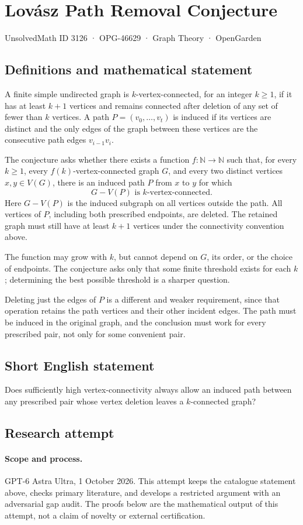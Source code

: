 \documentclass[11pt,a4paper]{article}
\begin{document}
\section*{Lovász Path Removal Conjecture}\label{3126}
{\small UnsolvedMath ID 3126 · OPG-46629 · Graph Theory · OpenGarden}
\subsection{Definitions and mathematical statement}
A finite simple undirected graph is $k$-vertex-connected, for an integer
$k\ge1$, if it has at least $k+1$ vertices and remains connected after
deletion of any set of fewer than $k$ vertices. A path
$P=(v_0,\ldots,v_t)$ is induced if its vertices are distinct and the
only edges of the graph between these vertices are the consecutive
path edges $v_{i-1}v_i$.

The conjecture asks whether there exists a function
$f:\mathbb N\to\mathbb N$ such that, for every $k\ge1$, every
$f(k)$-vertex-connected graph $G$, and every two distinct vertices
$x,y\in V(G)$, there is an induced path $P$ from $x$ to $y$ for which
\[
 G-V(P)\text{ is }k\text{-vertex-connected}.
\]
Here $G-V(P)$ is the induced subgraph on all vertices outside the path.
All vertices of $P$, including both prescribed endpoints, are deleted.
The retained graph must still have at least $k+1$ vertices under the
connectivity convention above.

The function may grow with $k$, but cannot depend on $G$, its order,
or the choice of endpoints. The conjecture asks only that some finite
threshold exists for each $k$; determining the best possible threshold
is a sharper question.

Deleting just the edges of $P$ is a different and weaker requirement,
since that operation retains the path vertices and their other incident
edges. The path must be induced in the original graph, and the conclusion
must work for every prescribed pair, not only for some convenient pair.
\subsection{Short English statement}
Does sufficiently high vertex-connectivity always allow an induced path between any prescribed pair whose vertex deletion leaves a $k$-connected graph?
\subsection{Research attempt}
\paragraph{Scope and process.}
GPT-6 Astra Ultra, 1 October 2026. This attempt keeps the catalogue statement above, checks primary literature, and develops a restricted argument with an adversarial gap audit. The proofs below are the mathematical output of this attempt, not a claim of novelty or external certification.
\end{document}
